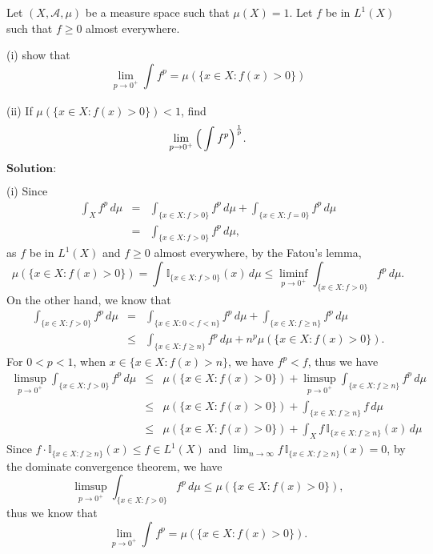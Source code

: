 \documentclass[12pt]{article}
\begin{document}
Let $(X, \mathcal{A}, \mu)$ be a measure space such that $\mu(X) = 1$. Let $f$ be in $L^{1}(X)$ such that $f \geq 0$ almost everywhere.

(i) show that
\begin{equation*}
    \lim_{p \to 0^{+}} \int_{}^{} f^{p} = \mu(\{x \in X:  f(x) > 0\})
\end{equation*}

(ii) If $\mu(\{x \in X:  f(x) > 0\}) < 1$, find
\begin{equation*}
    \lim_{p \to 0^{+}} \Big{(} \int_{}^{} f^{p} \Big{)}^{\frac{1}{p}}. 
\end{equation*}


\vspace{8pt}
$\textbf{Solution:}$

(i) Since
\begin{eqnarray*}
    \int_{X}^{} f^{p} \, d \mu & = & \int_{\{x \in X: f > 0\}}^{} f^{p} \, d \mu + \int_{\{x \in X: f = 0\}}^{} f^{p} \, d \mu \\
    & = & \int_{\{x \in X: f > 0\}}^{} f^{p} \, d \mu,
\end{eqnarray*}
as $f$ be in $L^{1}(X)$ and $f \geq 0$ almost everywhere, by the Fatou's lemma,
\begin{equation*}
    \mu(\{x \in X:  f(x) > 0\}) = \int_{}^{} \mathbb{I}_{\{x \in X: f > 0\}} (x) \, d \mu \leq \liminf_{p \to 0^{+}} \int_{\{x \in X: f > 0\}}^{} f^{p} \, d \mu.
\end{equation*}
On the other hand, we know that
\begin{eqnarray*}
    \int_{\{x \in X: f > 0\}}^{} f^{p} \, d \mu & = & \int_{\{x \in X: 0 < f < n\}}^{} f^{p} \, d \mu  + \int_{\{x \in X: f \geq n\}}^{} f^{p} \, d \mu \\
    & \leq & \int_{\{x \in X: f \geq n\}}^{} f^{p} \, d \mu + n^{p} \mu(\{x \in X:  f(x) > 0\}).
\end{eqnarray*}
For $0 < p < 1$, when $x \in \{x \in X:  f(x) > n\}$, we have $f^{p} < f$, thus we have
\begin{eqnarray*}
    \limsup_{p \to 0^{+}} \int_{\{x \in X: f > 0\}}^{} f^{p} \, d \mu & \leq &  \mu(\{x \in X:  f(x) > 0\}) + \limsup_{p \to 0^{+}} \int_{\{x \in X: f \geq n\}}^{} f^{p} \, d \mu \\
    & \leq & \mu(\{x \in X:  f(x) > 0\}) + \int_{\{x \in X: f \geq n\}}^{} f \, d \mu \\
    & \leq & \mu(\{x \in X:  f(x) > 0\}) + \int_{X}^{} f \, \mathbb{I}_{\{x \in X: f \geq n\}}(x) \, d \mu
\end{eqnarray*}
Since $f \cdot \mathbb{I}_{\{x \in X: f \geq n\}}(x) \leq f \in L^{1}(X)$ and $\lim_{n \to \infty} f \, \mathbb{I}_{\{x \in X: f \geq n\}}(x) = 0 $, by the dominate convergence theorem, we have
\begin{equation*}
    \limsup_{p \to 0^{+}} \int_{\{x \in X: f > 0\}}^{} f^{p} \, d \mu \leq \mu(\{x \in X:  f(x) > 0\}),
\end{equation*}
thus we know that
\begin{equation*}
    \lim_{p \to 0^{+}} \int_{}^{} f^{p} = \mu(\{x \in X:  f(x) > 0\}).
\end{equation*}
\end{document}
